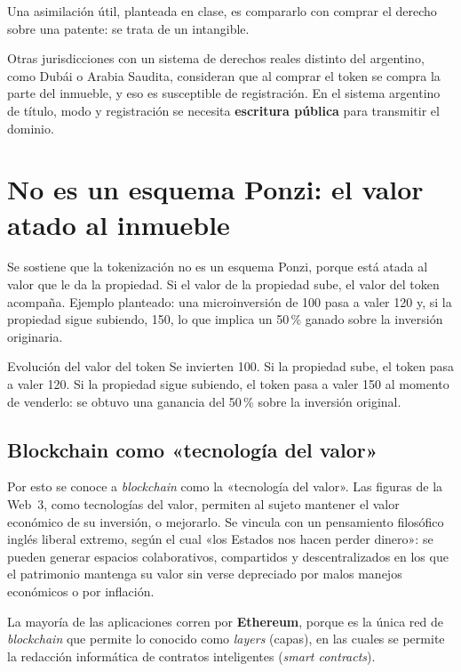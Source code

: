 \documentclass[12pt,oneside]{book}
\begin{document}
Una asimilación útil, planteada en clase, es compararlo con comprar el derecho sobre una patente: se trata de un intangible.

\begin{note}
Otras jurisdicciones con un sistema de derechos reales distinto del argentino, como Dubái o Arabia Saudita, consideran que al comprar el token se compra la parte del inmueble, y eso es susceptible de registración. En el sistema argentino de título, modo y registración se necesita \textbf{escritura pública} para transmitir el dominio.
\end{note}

\section{No es un esquema Ponzi: el valor atado al inmueble}

Se sostiene que la tokenización no es un esquema Ponzi, porque está atada al valor que le da la propiedad. Si el valor de la propiedad sube, el valor del token acompaña. Ejemplo planteado: una microinversión de 100 pasa a valer 120 y, si la propiedad sigue subiendo, 150, lo que implica un 50\,\% ganado sobre la inversión originaria.

\begin{example}{Evolución del valor del token}
Se invierten 100. Si la propiedad sube, el token pasa a valer 120. Si la propiedad sigue subiendo, el token pasa a valer 150 al momento de venderlo: se obtuvo una ganancia del 50\,\% sobre la inversión original.
\end{example}

\subsection{Blockchain como «tecnología del valor»}

Por esto se conoce a \textit{blockchain} como la «tecnología del valor». Las figuras de la Web~3, como tecnologías del valor, permiten al sujeto mantener el valor económico de su inversión, o mejorarlo. Se vincula con un pensamiento filosófico inglés liberal extremo, según el cual «los Estados nos hacen perder dinero»: se pueden generar espacios colaborativos, compartidos y descentralizados en los que el patrimonio mantenga su valor sin verse depreciado por malos manejos económicos o por inflación.

La mayoría de las aplicaciones corren por \textbf{Ethereum}, porque es la única red de \textit{blockchain} que permite lo conocido como \textit{layers} (capas), en las cuales se permite la redacción informática de contratos inteligentes (\textit{smart contracts}).
\end{document}
